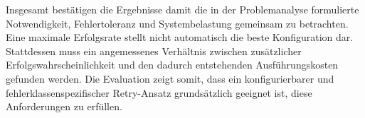 Insgesamt bestätigen die Ergebnisse damit die in der Problemanalyse formulierte Notwendigkeit, Fehlertoleranz und
Systembelastung gemeinsam zu betrachten.
Eine maximale Erfolgsrate stellt nicht automatisch die beste Konfiguration dar.
Stattdessen muss ein angemessenes Verhältnis zwischen zusätzlicher Erfolgswahrscheinlichkeit und den dadurch
entstehenden Ausführungskosten gefunden werden.
Die Evaluation zeigt somit, dass ein konfigurierbarer und fehlerklassenspezifischer Retry-Ansatz grundsätzlich
geeignet ist, diese Anforderungen zu erfüllen.
